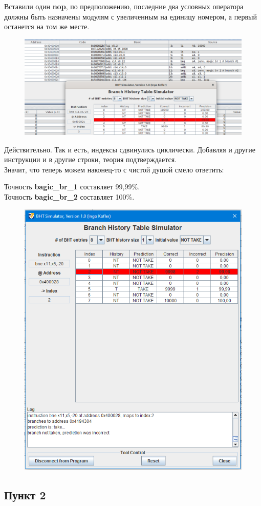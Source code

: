 Вставили один \textbf{nop}, по предположению, последние два условных оператора должны быть назначены модулям с увеличенным на единицу номером, а первый останется на том же месте.

\begin{figure}[H]
    \centering
    \includegraphics[width=1\linewidth]{Part1/index2.png}
\end{figure}

Действительно. Так и есть, индексы сдвинулись циклически.
Добавляя и другие инструкции и в другие строки, теория подтверждается. \\

Значит, что теперь можем наконец-то с чистой душой смело ответить:

Точность \textbf{bagic\_br\_1} составляет 99,99\%.\\
Точность \textbf{bagic\_br\_2} составляет 100\%.

\begin{figure}[H]
    \centering
    \includegraphics[width=0.5\linewidth]{Part1/BHT.png}
\end{figure}

\subsection*{Пункт 2}

